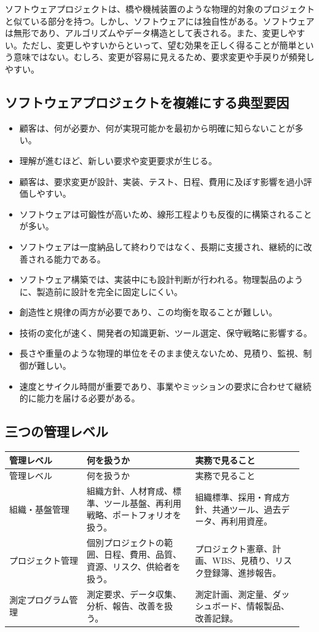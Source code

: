 \documentclass[a4paper,11pt]{ltjsarticle}
\begin{document}
ソフトウェアプロジェクトは、橋や機械装置のような物理的対象のプロジェクトと似ている部分を持つ。しかし、ソフトウェアには独自性がある。ソフトウェアは無形であり、アルゴリズムやデータ構造として表される。また、変更しやすい。ただし、変更しやすいからといって、望む効果を正しく得ることが簡単という意味ではない。むしろ、変更が容易に見えるため、要求変更や手戻りが頻発しやすい。

\subsection{ソフトウェアプロジェクトを複雑にする典型要因}
\begin{itemize}[leftmargin=2em]
  \item 顧客は、何が必要か、何が実現可能かを最初から明確に知らないことが多い。
  \item 理解が進むほど、新しい要求や変更要求が生じる。
  \item 顧客は、要求変更が設計、実装、テスト、日程、費用に及ぼす影響を過小評価しやすい。
  \item ソフトウェアは可鍛性が高いため、線形工程よりも反復的に構築されることが多い。
  \item ソフトウェアは一度納品して終わりではなく、長期に支援され、継続的に改善される能力である。
  \item ソフトウェア構築では、実装中にも設計判断が行われる。物理製品のように、製造前に設計を完全に固定しにくい。
  \item 創造性と規律の両方が必要であり、この均衡を取ることが難しい。
  \item 技術の変化が速く、開発者の知識更新、ツール選定、保守戦略に影響する。
  \item 長さや重量のような物理的単位をそのまま使えないため、見積り、監視、制御が難しい。
  \item 速度とサイクル時間が重要であり、事業やミッションの要求に合わせて継続的に能力を届ける必要がある。
\end{itemize}
\subsection{三つの管理レベル}
\begin{longtable}{>{\raggedright\arraybackslash}p{0.25\linewidth}>{\raggedright\arraybackslash}p{0.35\linewidth}>{\raggedright\arraybackslash}p{0.35\linewidth}}
\toprule
管理レベル & 何を扱うか & 実務で見ること \\
\midrule
\endfirsthead
\toprule
管理レベル & 何を扱うか & 実務で見ること \\
\midrule
\endhead
組織・基盤管理 & 組織方針、人材育成、標準、ツール基盤、再利用戦略、ポートフォリオを扱う。 & 組織標準、採用・育成方針、共通ツール、過去データ、再利用資産。 \\
プロジェクト管理 & 個別プロジェクトの範囲、日程、費用、品質、資源、リスク、供給者を扱う。 & プロジェクト憲章、計画、WBS、見積り、リスク登録簿、進捗報告。 \\
測定プログラム管理 & 測定要求、データ収集、分析、報告、改善を扱う。 & 測定計画、測定量、ダッシュボード、情報製品、改善記録。 \\
\bottomrule
\end{longtable}
\end{document}
